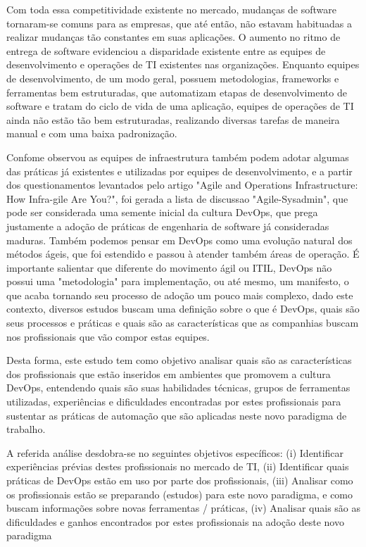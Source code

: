 \documentclass[twoside,english,brazilian]{UNISINOSartigo}
\begin{document}
Com toda essa competitividade existente no mercado, mudanças de software tornaram-se comuns para as empresas, que até então, não estavam habituadas a realizar mudanças tão constantes em suas aplicações. O aumento no ritmo de entrega de software evidenciou a disparidade existente entre as equipes de desenvolvimento e operações de TI existentes nas organizações. Enquanto equipes de desenvolvimento, de um modo geral, possuem metodologias, frameworks e ferramentas bem estruturadas, que automatizam etapas de desenvolvimento de software e tratam do ciclo de vida de uma aplicação, equipes de operações de TI ainda  não estão tão bem estruturadas, realizando diversas tarefas de maneira manual e com uma baixa padronização. 

Confome  observou as equipes de infraestrutura também podem adotar algumas das práticas já existentes e utilizadas por equipes de desenvolvimento, e a partir dos questionamentos levantados pelo artigo "Agile and Operations Infrastructure: How Infra-gile Are You?", 
foi gerada a lista de discussao "Agile-Sysadmin", que pode ser considerada uma semente inicial da cultura DevOps, que prega justamente a adoção de práticas de engenharia de software já consideradas maduras. Também podemos pensar em DevOps como uma evolução natural dos métodos ágeis, que foi estendido e passou à atender também áreas de operação. É importante salientar que diferente do movimento ágil ou ITIL, DevOps não possui uma "metodologia" para implementação, ou até mesmo, um manifesto, o que acaba tornando seu processo de adoção um pouco mais complexo, dado este contexto, diversos estudos buscam uma definição sobre o que é DevOps, quais são seus processos e práticas e quais são as características que as companhias buscam nos profissionais que vão compor estas equipes.

Desta forma, este estudo tem como objetivo analisar quais são as características dos profissionais que estão inseridos em ambientes que promovem a cultura DevOps, entendendo quais são suas habilidades técnicas, grupos de ferramentas utilizadas, experiências e dificuldades encontradas por estes profissionais para sustentar as práticas de automação que são aplicadas neste novo paradigma de trabalho.

A referida análise desdobra-se no seguintes objetivos específicos: (i) Identificar experiências prévias destes profissionais no mercado de TI, (ii) Identificar quais práticas de DevOps estão em uso por parte dos profissionais, (iii) Analisar como os profissionais estão se preparando (estudos) para este novo paradigma, e como buscam informações sobre novas ferramentas / práticas, (iv) Analisar quais são as dificuldades e ganhos encontrados por estes profissionais na adoção deste novo paradigma
\end{document}
